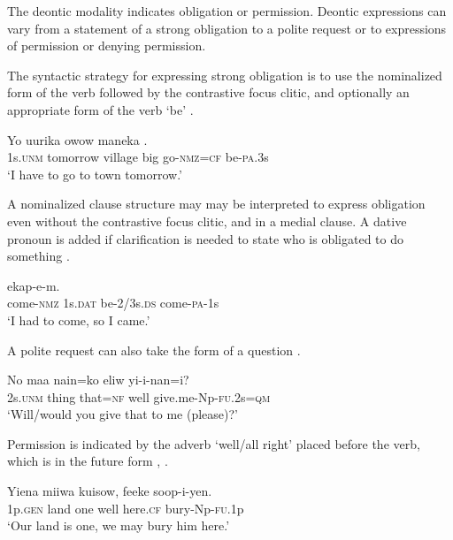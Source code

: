 The deontic modality indicates obligation or permission. Deontic expressions can vary from a statement of a strong obligation to a polite request or to expressions of permission or denying permission. 

The syntactic strategy for expressing strong obligation is to use the nominalized form of the verb followed by the contrastive focus clitic, and optionally an appropriate form of the verb `be' . 

\ea%
\label{ex:6:x1077}
\gll Yo  uurika  owow  maneka    . \\
1s.\textsc{unm}  tomorrow  village  big  go-\textsc{nmz}=\textsc{cf}  be-\textsc{pa}.3s\\
\glt `I have to go to town tomorrow.'
\z

A nominalized clause structure may may be interpreted to express obligation even without the contrastive focus clitic, and in a medial clause. A dative pronoun is added if clarification is needed to state who is obligated to do something . 

\ea%
\label{ex:6:x1079}
\gll {}      ekap-e-m. \\
come-\textsc{nmz}  1s.\textsc{dat}  be-2/3s.\textsc{ds}  come-\textsc{pa}-1s\\
\glt `I had to come, so I came.'
\z

A polite request can also take the form of a question .

\ea%
\label{ex:6:x1163}
\gll No  maa  nain=ko  eliw  yi-i-nan=i? \\
2s.\textsc{unm}  thing  that=\textsc{nf}  well  give.me-Np-\textsc{fu}.2s=\textsc{qm}\\
\glt `Will/would you give that to me (please)?'
\z

Permission is indicated by the adverb  `well/all right' placed before the verb, which is in the future form , .

\ea%
\label{ex:6:x1085}
\gll Yiena  miiwa  kuisow,    feeke  soop-i-yen. \\
1p.\textsc{gen}  land  one  well  here.\textsc{cf}  bury-Np-\textsc{fu}.1p\\
\glt `Our land is one, we may bury him here.'
\z

